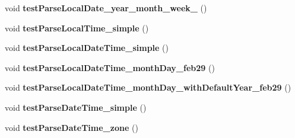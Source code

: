 \begin{DoxyCompactItemize}
\item 
\hypertarget{classorg_1_1joda_1_1time_1_1format_1_1_test_date_time_formatter_ac0582abe6504ff4d52e68e62592216d3}{void {\bfseries test\-Parse\-Local\-Date\-\_\-year\-\_\-month\-\_\-week\-\_} ()}\label{classorg_1_1joda_1_1time_1_1format_1_1_test_date_time_formatter_ac0582abe6504ff4d52e68e62592216d3}

\item 
\hypertarget{classorg_1_1joda_1_1time_1_1format_1_1_test_date_time_formatter_a4c149243944efcbf3d7a94ae0bb1c2ad}{void {\bfseries test\-Parse\-Local\-Time\-\_\-simple} ()}\label{classorg_1_1joda_1_1time_1_1format_1_1_test_date_time_formatter_a4c149243944efcbf3d7a94ae0bb1c2ad}

\item 
\hypertarget{classorg_1_1joda_1_1time_1_1format_1_1_test_date_time_formatter_a4e314bd82f7b28b556ac85c604354dab}{void {\bfseries test\-Parse\-Local\-Date\-Time\-\_\-simple} ()}\label{classorg_1_1joda_1_1time_1_1format_1_1_test_date_time_formatter_a4e314bd82f7b28b556ac85c604354dab}

\item 
\hypertarget{classorg_1_1joda_1_1time_1_1format_1_1_test_date_time_formatter_a7b81bceac1727c5dcaf0fc471b5f5a59}{void {\bfseries test\-Parse\-Local\-Date\-Time\-\_\-month\-Day\-\_\-feb29} ()}\label{classorg_1_1joda_1_1time_1_1format_1_1_test_date_time_formatter_a7b81bceac1727c5dcaf0fc471b5f5a59}

\item 
\hypertarget{classorg_1_1joda_1_1time_1_1format_1_1_test_date_time_formatter_accf998de452f0206cd47fb07c1ac4b77}{void {\bfseries test\-Parse\-Local\-Date\-Time\-\_\-month\-Day\-\_\-with\-Default\-Year\-\_\-feb29} ()}\label{classorg_1_1joda_1_1time_1_1format_1_1_test_date_time_formatter_accf998de452f0206cd47fb07c1ac4b77}

\item 
\hypertarget{classorg_1_1joda_1_1time_1_1format_1_1_test_date_time_formatter_a93e4a767985ba15f9837d0643744d82c}{void {\bfseries test\-Parse\-Date\-Time\-\_\-simple} ()}\label{classorg_1_1joda_1_1time_1_1format_1_1_test_date_time_formatter_a93e4a767985ba15f9837d0643744d82c}

\item 
\hypertarget{classorg_1_1joda_1_1time_1_1format_1_1_test_date_time_formatter_aded3e44f7175a6ccf585f44932738528}{void {\bfseries test\-Parse\-Date\-Time\-\_\-zone} ()}\label{classorg_1_1joda_1_1time_1_1format_1_1_test_date_time_formatter_aded3e44f7175a6ccf585f44932738528}


\end{DoxyCompactItemize}
